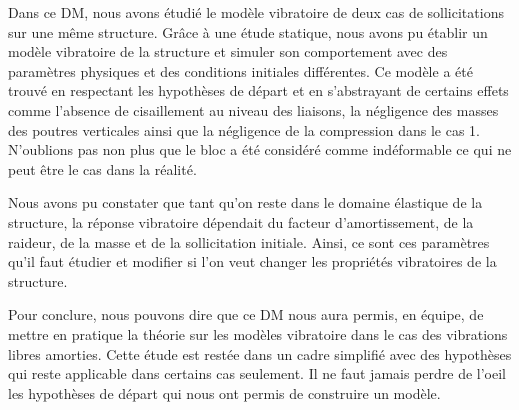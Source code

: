\documentclass[a4paper,10pt]{report} %
\begin{document}
Dans ce DM, nous avons étudié le modèle vibratoire de deux cas de sollicitations sur une même structure. Grâce à une étude statique, nous avons pu établir un modèle vibratoire de la structure et simuler son comportement avec des paramètres physiques et des conditions initiales différentes. Ce modèle a été trouvé en respectant les hypothèses de départ et en s'abstrayant de certains effets comme l'absence de cisaillement au niveau des liaisons, la négligence des masses des poutres verticales ainsi que la négligence de la compression dans le cas 1. N'oublions pas non plus que le bloc a été considéré comme indéformable ce qui ne peut être le cas dans la réalité.

Nous avons pu constater que tant qu'on reste dans le domaine élastique de la structure, la réponse vibratoire dépendait du facteur d'amortissement, de la raideur, de la masse et de la sollicitation initiale. Ainsi, ce sont ces paramètres qu'il faut étudier et modifier si l'on veut changer les propriétés vibratoires de la structure.

Pour conclure, nous pouvons dire que ce DM nous aura permis, en équipe, de mettre en pratique la théorie sur les modèles vibratoire dans le cas des vibrations libres amorties. Cette étude est restée dans un cadre simplifié avec des hypothèses qui reste applicable dans certains cas seulement. Il ne faut jamais perdre de l'oeil les hypothèses de départ qui nous ont permis de construire un modèle. 













%
%	
\end{document}
